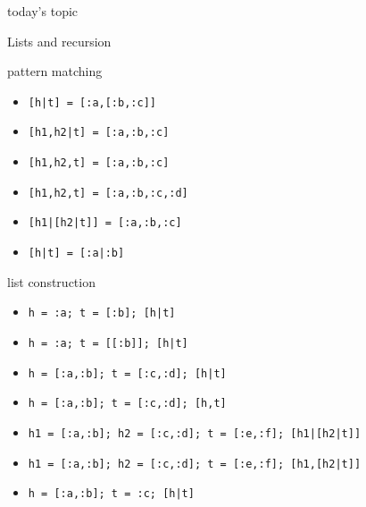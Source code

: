 \begin{frame}{today's topic}

\vspace{60pt}\hspace{80pt}Lists and recursion

\end{frame}

\begin{frame}{pattern matching}
\begin{itemize}
\pause \item  {\tt [h|t] = [:a,[:b,:c]]}  
\pause \item  {\tt [h1,h2|t] = [:a,:b,:c]} 
\pause \item  {\tt [h1,h2,t] = [:a,:b,:c]} 
\pause \item  {\tt [h1,h2,t] = [:a,:b,:c,:d]} 
\pause \item  {\tt [h1|[h2|t]] = [:a,:b,:c]}
\pause \item  {\tt [h|t] = [:a|:b]}
\end{itemize}
\end{frame}

\begin{frame}{list construction}
\begin{itemize}
\pause \item  {\tt h = :a; t = [:b]; [h|t]}
\pause \item  {\tt h = :a; t = [[:b]]; [h|t]}
\pause \item  {\tt h = [:a,:b]; t = [:c,:d]; [h|t]}
\pause \item  {\tt h = [:a,:b]; t = [:c,:d]; [h,t]}
\pause \item  {\tt h1 = [:a,:b]; h2 = [:c,:d]; t = [:e,:f]; [h1|[h2|t]]}
\pause \item  {\tt h1 = [:a,:b]; h2 = [:c,:d]; t = [:e,:f]; [h1,[h2|t]]}
\pause \item  {\tt h = [:a,:b]; t = :c; [h|t]}
\end{itemize}
\end{frame}


